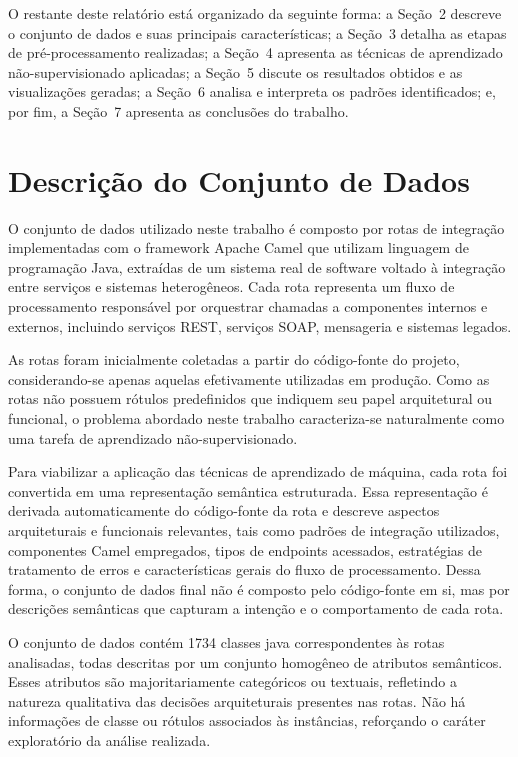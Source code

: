 \documentclass[12pt,a4paper]{article}
\begin{document}
O restante deste relatório está organizado da seguinte forma: a Seção~2 descreve o conjunto de dados e suas principais características; a Seção~3 detalha as etapas de pré-processamento realizadas; a Seção~4 apresenta as técnicas de aprendizado não-supervisionado aplicadas; a Seção~5 discute os resultados obtidos e as visualizações geradas; a Seção~6 analisa e interpreta os padrões identificados; e, por fim, a Seção~7 apresenta as conclusões do trabalho.

\section{Descrição do Conjunto de Dados}

O conjunto de dados utilizado neste trabalho é composto por rotas de integração implementadas com o framework Apache Camel que utilizam linguagem de programação Java, extraídas de um sistema real de software voltado à integração entre serviços e sistemas heterogêneos. Cada rota representa um fluxo de processamento responsável por orquestrar chamadas a componentes internos e externos, incluindo serviços REST, serviços SOAP, mensageria e sistemas legados.

As rotas foram inicialmente coletadas a partir do código-fonte do projeto, considerando-se apenas aquelas efetivamente utilizadas em produção. Como as rotas não possuem rótulos predefinidos que indiquem seu papel arquitetural ou funcional, o problema abordado neste trabalho caracteriza-se naturalmente como uma tarefa de aprendizado não-supervisionado.

Para viabilizar a aplicação das técnicas de aprendizado de máquina, cada rota foi convertida em uma representação semântica estruturada. Essa representação é derivada automaticamente do código-fonte da rota e descreve aspectos arquiteturais e funcionais relevantes, tais como padrões de integração utilizados, componentes Camel empregados, tipos de endpoints acessados, estratégias de tratamento de erros e características gerais do fluxo de processamento. Dessa forma, o conjunto de dados final não é composto pelo código-fonte em si, mas por descrições semânticas que capturam a intenção e o comportamento de cada rota.

O conjunto de dados contém 1734 classes java correspondentes às rotas analisadas, todas descritas por um conjunto homogêneo de atributos semânticos. Esses atributos são majoritariamente categóricos ou textuais, refletindo a natureza qualitativa das decisões arquiteturais presentes nas rotas. Não há informações de classe ou rótulos associados às instâncias, reforçando o caráter exploratório da análise realizada.
\end{document}
